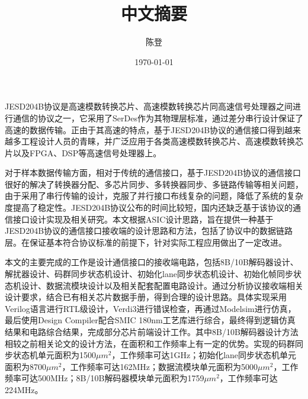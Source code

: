 \documentclass[UTF8]{ctexart}
\title{中文摘要}
\author{陈登}
\date{\today}
\begin{document}
JESD204B协议是高速模数转换芯片、高速模数转换芯片同高速信号处理器之间进行通信的协议之一，它采用了SerDes作为其物理层标准，通过差分串行设计保证了高速的数据传输。正由于其高速的特点，基于JESD204B协议的通信接口得到越来越多工程设计人员的青睐，并广泛应用于各类高速模数转换芯片、高速模数转换芯片以及FPGA、DSP等高速信号处理器上。

对于样本数据传输方面，相对于传统的通信接口，基于JESD204B协议的通信接口很好的解决了转换器分配、多芯片同步、多转换器同步、多链路传输等相关问题，由于采用了串行传输的设计，克服了并行接口布线复杂的问题，降低了系统的复杂度提高了稳定性。JESD204B协议公布的时间比较短，国内还缺乏基于该协议的通信接口设计实现及相关研究。本文根据ASIC设计思路，旨在提供一种基于JESD204B协议的通信接口接收端的设计思路和方法，包括了协议中的数据链路层。在保证基本符合协议标准的前提下，针对实际工程应用做出了一定改进。

本文的主要完成的工作是设计通信接口的接收端电路，包括8B/10B解码器设计、解扰器设计、码群同步状态机设计、初始化lane同步状态机设计、初始化帧同步状态机设计、数据流模块设计以及相关配套配置电路设计。通过分析协议接收端相关设计要求，结合已有相关芯片数据手册，得到合理的设计思路。具体实现采用Verilog语言进行RTL级设计，Verdi3进行错误检查，再通过Modelsim进行仿真，最后使用Design Compiler配合SMIC 180nm工艺库进行综合，最终得到逻辑仿真结果和电路综合结果，完成部分芯片前端设计工作。其中8B/10B解码器设计方法相较之前相关论文的设计方法，在面积和工作频率上有一定的优势。实现的码群同步状态机单元面积为1500$\mu m^2$，工作频率可达1GHz；初始化lane同步状态机单元面积为8700$\mu m^2$，工作频率可达162MHz；数据流模块单元面积为5000$\mu m^2$，工作频率可达500MHz；8B/10B解码器模块单元面积为1759$\mu m^2$，工作频率可达224MHz。


\end{document}
